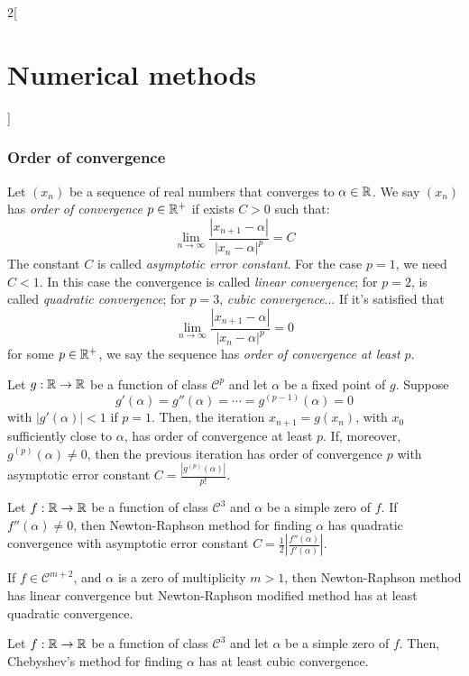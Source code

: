 \documentclass[../../../main.tex]{subfiles}
\begin{document}
\begin{multicols}{2}[\section{Numerical methods}]
    \subsubsection*{Order of convergence}
    \begin{definition}
        Let $(x_n)$ be a sequence of real numbers that converges to $\alpha\in\mathbb{R}$. We say $(x_n)$ has \textit{order of convergence $p\in\mathbb{R}^+$} if exists $C>0$ such that: $$\lim_{n\to\infty}\frac{|x_{n+1}-\alpha|}{|x_n-\alpha|^p}=C$$ The constant $C$ is called \textit{asymptotic error constant}. For the case $p=1$, we need $C<1$. In this case the convergence is called \textit{linear convergence}; for $p=2$, is called \textit{quadratic convergence}; for $p=3$, \textit{cubic convergence}... If it's satisfied that $$\lim_{n\to\infty}\frac{|x_{n+1}-\alpha|}{|x_n-\alpha|^p}=0$$ for some $p\in\mathbb{R}^+$, we say the sequence has \textit{order of convergence at least $p$}.
    \end{definition}
    \begin{theorem}
        Let $g:\mathbb{R}\rightarrow\mathbb{R}$ be a function of class $\mathcal{C}^p$ and let $\alpha$ be a fixed point of $g$. Suppose $$g'(\alpha)=g''(\alpha)=\cdots=g^{(p-1)}(\alpha)=0$$ with $|g'(\alpha)|<1$ if $p=1$. Then, the iteration $x_{n+1}=g(x_n)$, with $x_0$ sufficiently close to $\alpha$, has order of convergence at least $p$. If, moreover, $g^{(p)}(\alpha)\ne0$, then the previous iteration has order of convergence $p$ with asymptotic error constant $C=\frac{|g^{(p)}(\alpha)|}{p!}$.
    \end{theorem}
    \begin{theorem}
        Let $f:\mathbb{R}\rightarrow\mathbb{R}$ be a function of class $\mathcal{C}^3$ and $\alpha$ be a simple zero of $f$. If $f''(\alpha)\ne0$, then Newton-Raphson method for finding $\alpha$ has quadratic convergence with asymptotic error constant $C=\frac{1}{2}\left|\frac{f''(\alpha)}{f'(\alpha)}\right|$.\par If $f\in\mathcal{C}^{m+2}$, and $\alpha$ is a zero of multiplicity $m>1$, then Newton-Raphson method has linear convergence but Newton-Raphson modified method has at least quadratic convergence.
    \end{theorem}
    \begin{theorem}
        Let $f:\mathbb{R}\rightarrow\mathbb{R}$ be a function of class $\mathcal{C}^3$ and let $\alpha$ be a simple zero of $f$. Then, Chebyshev's method for finding $\alpha$ has at least cubic convergence.
    \end{theorem}
    \begin{definition}

\end{definition}
\end{multicols}
\end{document}
